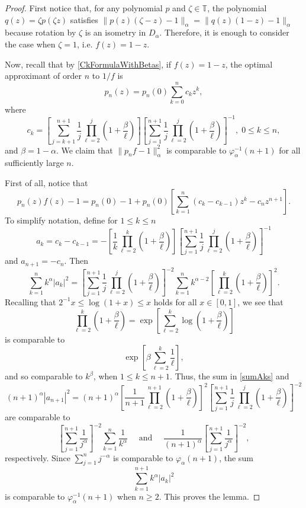 \documentclass[11 pt,reqno]{amsart}
\theoremstyle{definition}
\theoremstyle{remark}
\numberwithin{equation}{section} \numberwithin{figure}{section}
\newcommand{\TT}{{\mathbb T}}
\begin{document}
\begin{proof}
First notice that, for any polynomial $p$ and $\zeta \in \TT$, the polynomial
$q(z)=\zeta p(\zeta z)$ satisfies $\|p(z)(\zeta-z)-1\|_{\alpha}=\|q(z)(1-z)-1\|_{\alpha}$
because rotation by $\zeta$ is an isometry in $D_{\alpha}$.  Therefore, it is enough
to consider the case when $\zeta=1$, i.e. $f(z) = 1 - z$.

Now, recall that by \eqref{CkFormulaWithBetas}, if $f(z)=1-z$, the
optimal approximant of order $n$ to $1/f$ is
\[  p_{n}(z)=p_{n}(0)\sum_{k=0}^{n}c_{k}z^{k},  \]
where
\begin{equation*}
            c_k=\left[\sum_{j=k+1}^{n+1}\frac{1}{j}
            \prod_{\ell=2}^j \left(1+\frac{\beta}{\ell}\right)\right]
            \left[\sum_{j=1}^{n+1}\frac{1}{j}
            \prod_{\ell=2}^j\left(1+\frac{\beta}{\ell}\right)\right]^{-1},
            \;0\leq k\leq n,
\end{equation*}
and $\beta=1-\alpha$.  We claim that $\|p_{n}f-1\|_{\alpha}^{2}$ is comparable
to $\varphi_{\alpha}^{-1}(n+1)$ for all sufficiently large $n$.

First of all, notice that
\[  p_{n}(z)f(z)-1=p_{n}(0)-1+p_{n}(0)
        \left[\sum_{k=1}^{n}(c_{k}-c_{k-1})z^{k}-c_{n}z^{n+1}\right].   \]
To simplify notation, define for $1\leq k\leq n$
\[  a_{k}=c_{k}-c_{k-1}=-
        \left[\frac{1}{k}\prod_{\ell=2}^k \left(1+\frac{\beta}{\ell}\right)\right]
        \left[\sum_{j=1}^{n+1}\frac{1}{j}
        \prod_{\ell=2}^j\left(1+\frac{\beta}{\ell}\right)\right]^{-1}
            \]
and $a_{n+1}=-c_{n}$.  Then
\begin{equation}\label{sumAks}
            \sum_{k=1}^{n}k^{\alpha}|a_{k}|^{2}
            =\left[\sum_{j=1}^{n+1}
            \frac{1}{j}\prod_{\ell=2}^j\left(1+\frac{\beta}{\ell}\right)\right]^{-2}
            \sum_{k=1}^{n}k^{\alpha-2}
            \left[\prod_{\ell=2}^k \left(1+\frac{\beta}{\ell}\right)\right]^{2}.
\end{equation}
Recalling that $2^{-1}x\leq\log(1+x)\leq x$ holds for all $x\in[0,1]$, we see that
\[  \prod_{\ell=2}^k \left(1+\frac{\beta}{\ell}\right)
        =\exp\left[\sum_{\ell=2}^k \log \left(1+\frac{\beta}{\ell}\right)\right]    \]
is comparable to
\[  \exp\left[\beta\sum_{\ell=2}^{k}\frac{1}{\ell}\right],  \]
and so comparable to $k^{\beta}$, when $1\leq k\leq n+1$.  Thus, the sum
in \eqref{sumAks} and
\[  (n+1)^{\alpha}|a_{n+1}|^{2}=(n+1)^{\alpha}\left[\frac{1}{n+1}
        \prod_{\ell=2}^{n+1}\left(1+\frac{\beta}{\ell}\right)\right]^{2}
        \left[\sum_{j=1}^{n+1}\frac{1}{j}
        \prod_{\ell=2}^j\left(1+\frac{\beta}{\ell}\right)\right]^{-2}   \]
are comparable to
\[  \left[\sum_{j=1}^{n+1}\frac{1}{j^{\alpha}}\right]^{-2}
        \sum_{k=1}^{n}\frac{1}{k^{\alpha}}\quad\text{ and }\quad
        \frac{1}{(n+1)^{\alpha}}
        \left[\sum_{j=1}^{n+1}\frac{1}{j^{\alpha}}\right]^{-2}, \]
respectively.  Since $\sum_{j=1}^{n}j^{-\alpha}$ is comparable to
$\varphi_{\alpha}(n+1)$, the sum
\[  \sum_{k=1}^{n+1}k^{\alpha}|a_{k}|^{2}   \]
is comparable to $\varphi_{\alpha}^{-1}(n+1)$ when $n\geq 2$.  This proves the lemma.
\end{proof}
\end{document}
